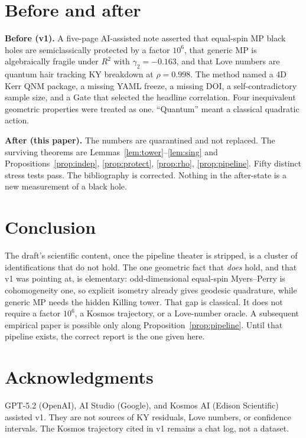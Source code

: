 \documentclass[11pt,a4paper]{article}
\begin{document}
\section{Before and after}

\textbf{Before (v1).} A five-page AI-assisted note asserted that
equal-spin MP black holes are semiclassically protected by a factor
\(10^6\), that generic MP is algebraically fragile under \(R^2\) with
\(\gamma_2=-0.163\), and that Love numbers are quantum hair tracking KY
breakdown at \(\rho=0.998\). The method named a 4D Kerr QNM package, a
missing YAML freeze, a missing DOI, a self-contradictory sample size,
and a Gate that selected the headline correlation. Four inequivalent
geometric properties were treated as one. ``Quantum'' meant a classical
quadratic action.

\textbf{After (this paper).} The numbers are quarantined and not
replaced. The surviving theorems are Lemmas~\ref{lem:tower}--\ref{lem:sing}
and Propositions~\ref{prop:indep}, \ref{prop:protect}, \ref{prop:rho},
\ref{prop:pipeline}. Fifty distinct stress tests pass. The bibliography
is corrected. Nothing in the after-state is a new measurement of a
black hole.

\section{Conclusion}

The draft's scientific content, once the pipeline theater is stripped,
is a cluster of identifications that do not hold. The one geometric
fact that \emph{does} hold, and that v1 was pointing at, is elementary:
odd-dimensional equal-spin Myers--Perry is cohomogeneity one, so
explicit isometry already gives geodesic quadrature, while generic MP
needs the hidden Killing tower. That gap is classical. It does not
require a factor \(10^6\), a Kosmos trajectory, or a Love-number
oracle. A subsequent empirical paper is possible only along
Proposition~\ref{prop:pipeline}. Until that pipeline exists, the
correct report is the one given here.

\section*{Acknowledgments}

GPT-5.2 (OpenAI), AI Studio (Google), and Kosmos AI (Edison Scientific)
assisted v1. They are not sources of KY residuals, Love numbers, or
confidence intervals. The Kosmos trajectory cited in v1 remains a chat
log, not a dataset.
\end{document}

